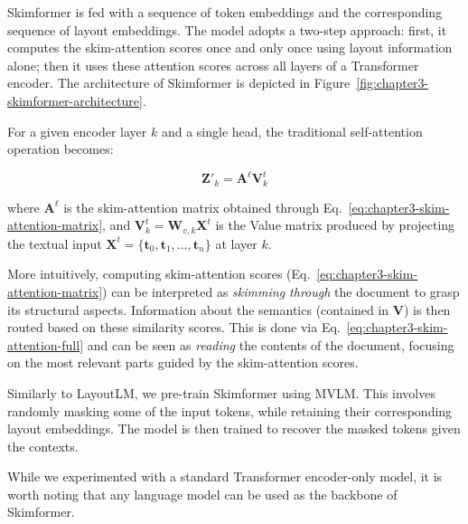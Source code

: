 Skimformer is fed with a sequence of token embeddings and the corresponding sequence of layout embeddings. The model adopts a two-step approach: first, it computes the skim-attention scores once and only once using layout information alone; then it uses these attention scores across all layers of a Transformer encoder. The architecture of Skimformer is depicted in Figure~\ref{fig:chapter3-skimformer-architecture}.

For a given encoder layer $k$ and a single head, the traditional self-attention operation becomes:

\begin{equation}
\label{eq:chapter3-skim-attention-full}
	\bm{Z}'_k = \bm{A}^{\ell} \bm{V}^{t}_{k}
\end{equation}

\noindent where $\bm{A}^{\ell}$ is the skim-attention matrix obtained through Eq.~\ref{eq:chapter3-skim-attention-matrix}, and $\bm{V}^{t}_{k} = \bm{W}_{v,k} \bm{X}^t$ is the Value matrix produced by projecting the textual input $\bm{X}^t = \{\bm{t}_0, \bm{t}_1, …, \bm{t}_n\}$ at layer $k$.

More intuitively, computing skim-attention scores (Eq.~\ref{eq:chapter3-skim-attention-matrix}) can be interpreted as \textit{skimming through} the document to grasp its structural aspects. Information about the semantics (contained in $\bm{V}$) is then routed based on these similarity scores. This is done via Eq.~\ref{eq:chapter3-skim-attention-full} and can be seen as \textit{reading} the contents of the document, focusing on the most relevant parts guided by the skim-attention scores.

Similarly to LayoutLM, we pre-train Skimformer using \ac{MVLM}. This involves randomly masking some of the input tokens, while retaining their corresponding layout embeddings. The model is then trained to recover the masked tokens given the contexts. 


While we experimented with a standard Transformer encoder-only model, it is worth noting that any language model can be used as the backbone of Skimformer.


